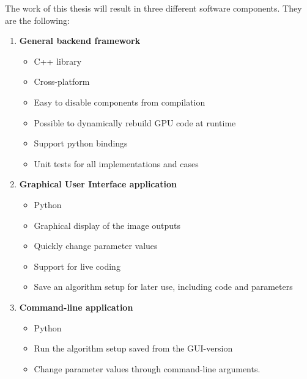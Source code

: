 The work of this thesis will result in three different software components. They are the following:

\begin{enumerate}
\item{\bf{General backend framework}}
\begin{itemize}
\item{C++ library}
\item{Cross-platform}
\item{Easy to disable components from compilation}
\item{Possible to dynamically rebuild GPU code at runtime}
\item{Support python bindings}
\item{Unit tests for all implementations and cases}
\end{itemize}

\item{\bf{Graphical User Interface application}}
\begin{itemize}
\item{Python}
\item{Graphical display of the image outputs}
\item{Quickly change parameter values}
\item{Support for live coding}
\item{Save an algorithm setup for later use, including code and parameters}
\end{itemize}

\item{\bf{Command-line application}}
\begin{itemize}
\item{Python}
\item{Run the algorithm setup saved from the GUI-version}
\item{Change parameter values through command-line arguments.}
\end{itemize}
\end{enumerate}
